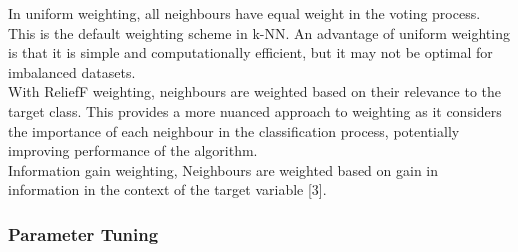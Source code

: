 In uniform weighting, all neighbours have equal weight in the voting process.
This is the default weighting scheme in k-NN.
An advantage of uniform weighting is that it is simple and computationally efficient, but it may not be optimal for imbalanced datasets.\\


With ReliefF weighting, neighbours are weighted based on their relevance to the target class.
This provides a more nuanced approach to weighting as it considers the importance of each neighbour in the classification process, potentially
improving performance of the algorithm.\\

Information gain weighting, Neighbours are weighted based on gain in information in the context of the target variable [3].



\subsubsection{Parameter Tuning}





